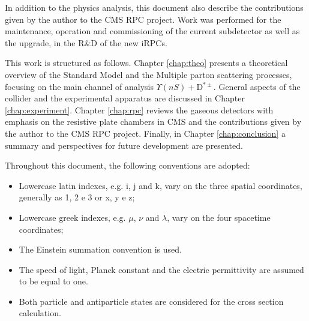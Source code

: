 In addition to the physics analysis, this document also describe the contributions given by the author to the CMS RPC project. Work was performed for the maintenance, operation and commissioning of the current subdetector as well as the upgrade, in the R\&D of the new iRPCs. 

This work is structured as follows. Chapter \ref{chap:theo} presents a theoretical overview of the Standard Model and the Multiple parton scattering processes, focusing on the main channel of analysis $\Upsilon(nS) + $D$^{*\pm}$. General aspects of the collider and the experimental apparatus are discussed in Chapter \ref{chap:experiment}. Chapter \ref{chap:rpc} reviews the gaseous detectors with emphasis on the resistive plate chambers in CMS and the contributions given by the author to the CMS RPC project. Finally, in Chapter \ref{chap:conclusion} a summary and perspectives for future development are presented.

Throughout this document, the following conventions are adopted:
\begin{itemize}
    \item Lowercase latin indexes, e.g. i, j and k, vary on the three spatial coordinates, generally as 1, 2 e 3 or x, y e z;
    \item Lowercase greek indexes, e.g. $\mu$, $\nu$ and $\lambda$, vary on the four spacetime coordinates;
    \item The Einstein summation convention is used.
    \item The speed of light, Planck constant and the electric permittivity are assumed to be equal to one.
    \item Both particle and antiparticle states are considered for the cross section calculation.
\end{itemize}